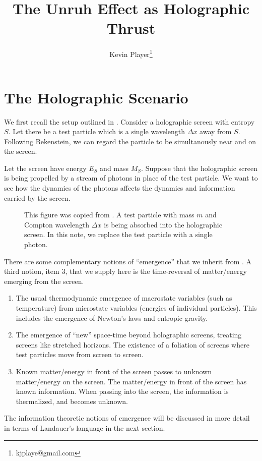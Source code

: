 \documentclass[12pt,a4paper]{article}
\begin{document}
\title{The Unruh Effect as Holographic Thrust}
\author[1]{Kevin Player\footnote{kjplaye@gmail.com}}

\maketitle


\section{The Holographic Scenario}
We first recall the setup outlined in \cite{entropic}. Consider a holographic screen with entropy $S$.  Let there be a test particle which is a single wavelength $\Delta x$ away from $S$.  Following Bekenstein, we can regard the particle to be simultanously near and on the screen.

Let the screen have energy $E_S$ and mass $M_S$.  Suppose that the holographic screen is being propelled by a stream of photons in place of the test particle.  We want to see how the dynamics of the photons affects the dynamics and information carried by the screen.

\begin{figure}[h]
\centering
\caption{This figure was copied from \cite{entropic}.  A test particle with mass $m$ and Compton wavelength $\Delta x$ is being absorbed into the holographic screen.  In this note, we replace the test particle with a single photon.}
\label{fig:x cubed graph}
\end{figure}
There are some complementary notions of ``emergence'' that we inherit from \cite{entropic}.  A third notion, item 3, that we supply here is the time-reversal of matter/energy emerging from the screen.
\begin{enumerate}
  \item The usual thermodynamic emergence of macrostate variables (such as temperature) from microstate variables (energies of individual particles).  This includes the emergence of Newton's laws and entropic gravity.
  \item The emergence of ``new'' space-time beyond holographic screens, treating screens like stretched horizons.  The existence of a foliation of screens where test particles move from screen to screen.
  \item Known matter/energy in front of the screen passes to unknown matter/energy on the screen. The matter/energy in front of the screen has known information.  When passing into the screen, the information is thermalized, and becomes unknown.
\end{enumerate}
The information theoretic notions of emergence will be discussed in more detail in terms of Landauer's language in the next section.
\end{document}
